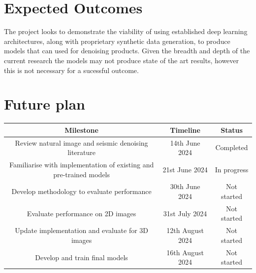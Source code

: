 \documentclass[project-plan]{report-template}
\begin{document}
\section{Expected Outcomes}
The project looks to demonstrate the viability of using established deep learning architectures, along with proprietary synthetic data generation, to produce models that can used for denoising products. Given the breadth and depth of the current research the models may not produce state of the art results, however this is not necessary for a sucessful outcome.

\section{Future plan}
\begin{table}[h]
\centering
\begin{tabular}{|c|c|c|}
\hline
\textbf{Milestone} & \textbf{Timeline} & \textbf{Status} \\
\hline
Review natural image and seismic denoising literature & 14th June 2024 & Completed \\
\hline
Familiarise with implementation of existing and pre-trained models & 21st June 2024 &  In progress \\ 
\hline
Develop methodology to evaluate performance & 30th June 2024 & Not started \\
\hline
Evaluate performance on 2D images  & 31st July 2024 & Not started \\
\hline
Update implementation and evaluate for 3D images  & 12th August 2024 & Not started \\
\hline
Develop and train final models & 16th August 2024 & Not started \\
\hline
\end{tabular}
\end{table}


\end{document}
